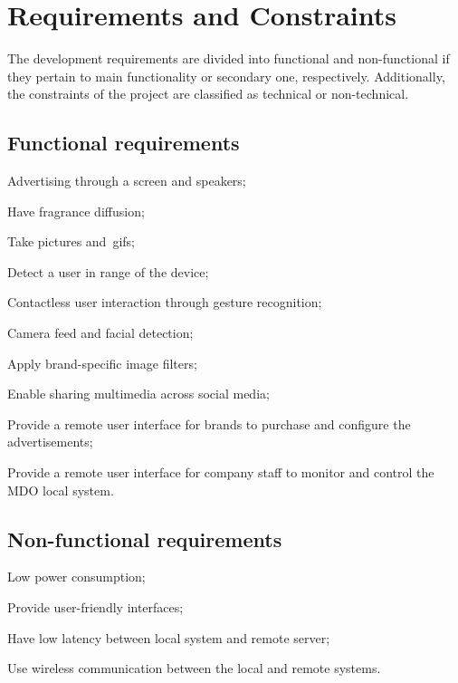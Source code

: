 \section{Requirements and Constraints}
\label{sec:req-const}
%
The development requirements are divided into functional and non-functional if they pertain to main functionality or secondary one, respectively. Additionally, the constraints of the project are classified as technical or non-technical.

\subsection{Functional requirements}
\label{sec:funct-requ}
%
\begin{item-c}
\item Advertising through a screen and speakers;
\item Have fragrance diffusion;
\item Take pictures and~\gls{gif}s;
\item Detect a user in range of the device;
\item Contactless user interaction through gesture recognition;
\item Camera feed and facial detection;
\item Apply brand-specific image filters;
\item Enable sharing multimedia across social media;
\item Provide a remote user interface for brands to purchase and configure the advertisements;
\item Provide a remote user interface for company staff to monitor and control
  the MDO local system.
\end{item-c}
%
\subsection{Non-functional requirements}
\label{sec:non-funct-requ}
%
\begin{item-c}
\item Low power consumption;
\item Provide user-friendly interfaces;
\item Have low latency between local system and remote server;
\item Use wireless communication between the local and remote systems.
\end{item-c}
%
